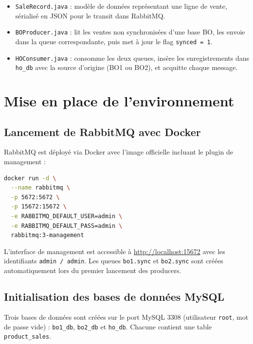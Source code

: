 \documentclass[a4paper,12pt]{article}
\begin{document}
\begin{itemize}
    \item \texttt{SaleRecord.java} : modèle de données représentant une ligne de vente, sérialisé en JSON pour le transit dans RabbitMQ.
    \item \texttt{BOProducer.java} : lit les ventes non synchronisées d'une base BO, les envoie dans la queue correspondante, puis met à jour le flag \texttt{synced = 1}.
    \item \texttt{HOConsumer.java} : consomme les deux queues, insère les enregistrements dans \texttt{ho\_db} avec la source d'origine (BO1 ou BO2), et acquitte chaque message.
\end{itemize}

\section{Mise en place de l'environnement}

\subsection{Lancement de RabbitMQ avec Docker}

RabbitMQ est déployé via Docker avec l'image officielle incluant le plugin de management :

\begin{lstlisting}[language=bash, caption={Démarrage du container RabbitMQ}]
docker run -d \
  --name rabbitmq \
  -p 5672:5672 \
  -p 15672:15672 \
  -e RABBITMQ_DEFAULT_USER=admin \
  -e RABBITMQ_DEFAULT_PASS=admin \
  rabbitmq:3-management
\end{lstlisting}

L'interface de management est accessible à \url{http://localhost:15672} avec les identifiants \texttt{admin / admin}. Les queues \texttt{bo1.sync} et \texttt{bo2.sync} sont créées automatiquement lors du premier lancement des producers.

\subsection{Initialisation des bases de données MySQL}

Trois bases de données sont créées sur le port MySQL 3308 (utilisateur \texttt{root}, mot de passe vide) : \texttt{bo1\_db}, \texttt{bo2\_db} et \texttt{ho\_db}. Chacune contient une table \texttt{product\_sales}.
\end{document}

